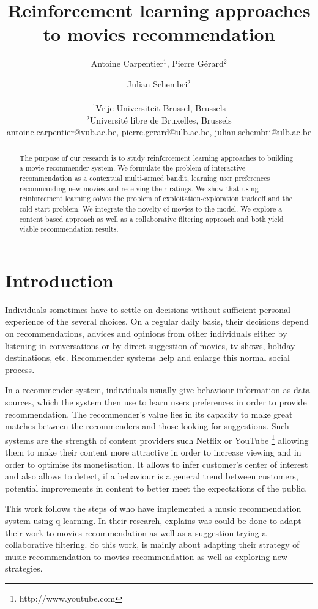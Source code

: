 \documentclass[letterpaper]{article}
\title{Reinforcement learning approaches to movies recommendation}
\author{Antoine Carpentier$^{1}$, Pierre Gérard$^{2}$ \and Julian Schembri$^2$ \\
\mbox{}\\
$^1$Vrije Universiteit Brussel, Brussels \\
$^2$Université libre de Bruxelles, Brussels \\
antoine.carpentier@vub.ac.be, pierre.gerard@ulb.ac.be, julian.schembri@ulb.ac.be}
\begin{document}
\maketitle

\begin{abstract}
  The purpose of our research is to study reinforcement learning approaches to building a movie recommender system. We formulate the problem of interactive recommendation as a contextual multi-armed bandit, learning user preferences recommanding new movies and receiving their ratings. We show that using reinforcement learning solves the problem of exploitation-exploration tradeoff and the cold-start problem. We integrate the novelty of movies to the model. We explore a content based approach as well as a collaborative filtering approach and both yield viable recommendation results.
\end{abstract}

\section{Introduction}


Individuals sometimes have to settle on decisions without sufficient personal experience of the several choices. On a regular daily basis, their decisions depend on recommendations, advices and opinions from other individuals either by listening in conversations or by direct suggestion of movies, tv shows, holiday destinations, etc. Recommender systems help and enlarge this normal social process.

In a recommender system, individuals usually give behaviour information as data sources, which the system then use to learn users preferences in order to provide recommendation. The recommender's value lies in its capacity to make great matches between the recommenders and those looking for suggestions. Such systems are the strength of content providers such Netflix \cite{netflix-article-recommender} or YouTube \footnote{http://www.youtube.com} allowing them to make their content more attractive in order to increase viewing and in order to optimise its monetisation. It allows to infer customer's center of interest and also allows to detect, if a behaviour is a general trend between customers, potential improvements in content to better meet the expectations of the public. 


This work follows the steps of \cite{main} who have implemented a music recommendation system using q-learning. In their research, \cite{main} explains was could be done to adapt their work to movies recommendation as well as a suggestion trying a collaborative filtering. So this work, is mainly about adapting their strategy of music recommendation to movies recommendation as well as exploring new strategies.
\end{document}

